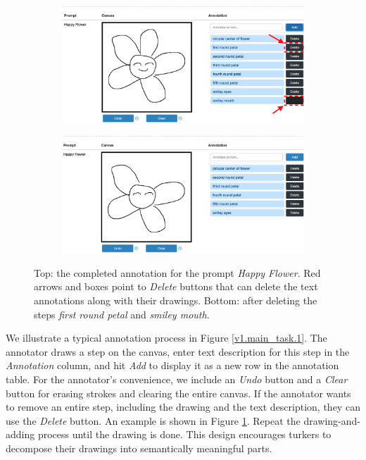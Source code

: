 \begin{figure}[!htb]
\begin{subfigure}{\textwidth}
\centering
\includegraphics[width=.8\linewidth]{data_collection/v1_before_delete.png}  
\end{subfigure}
\newline
\begin{subfigure}{\textwidth}
\centering
\includegraphics[width=.8\linewidth]{data_collection/v1_after_delete.png}  
\end{subfigure}
\caption{Top: the completed annotation for the prompt \textit{Happy Flower}. Red arrows and boxes point to \textit{Delete} buttons that can delete the text annotations along with their drawings. Bottom: after deleting the steps \textit{first round petal} and \textit{smiley mouth}.}
\label{v1.main_task.delete}
\end{figure}

We illustrate a typical annotation process in Figure \ref{v1.main_task.1}. 
The annotator draws a step on the canvas, enter text description for this step in the \textit{Annotation} column, and hit \textit{Add} to display it as a new row in the annotation table. 
For the annotator's convenience, we include an \textit{Undo} button and a \textit{Clear} button for erasing strokes and clearing the entire canvas. 
If the annotator wants to remove an entire step, including the drawing and the text description, they can use the \textit{Delete} button. An example is shown in Figure \ref{v1.main_task.delete}.
Repeat the drawing-and-adding process until the drawing is done. 
This design encourages turkers to decompose their drawings into semantically meaningful parts.

